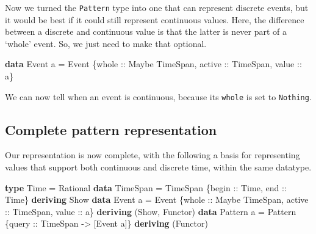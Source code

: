 \documentclass[
]{article}
\newenvironment{Shaded}{}{}
\newcommand{\DataTypeTok}[1]{\textcolor[rgb]{0.56,0.13,0.00}{#1}}
\newcommand{\KeywordTok}[1]{\textcolor[rgb]{0.00,0.44,0.13}{\textbf{#1}}}
\newcommand{\NormalTok}[1]{#1}
\newcommand{\OtherTok}[1]{\textcolor[rgb]{0.00,0.44,0.13}{#1}}
\begin{document}
Now we turned the \texttt{Pattern} type into one that can represent
discrete events, but it would be best if it could still represent
continuous values. Here, the difference between a discrete and
continuous value is that the latter is never part of a `whole' event.
So, we just need to make that optional.

\begin{Shaded}
\begin{Highlighting}[]
\KeywordTok{data} \DataTypeTok{Event}\NormalTok{ a }\OtherTok{=} \DataTypeTok{Event}\NormalTok{ \{}\OtherTok{whole ::} \DataTypeTok{Maybe} \DataTypeTok{TimeSpan}\NormalTok{,}\OtherTok{ active ::} \DataTypeTok{TimeSpan}\NormalTok{,}\OtherTok{ value ::}\NormalTok{ a\}}
\end{Highlighting}
\end{Shaded}

We can now tell when an event is continuous, because its \texttt{whole}
is set to \texttt{Nothing}.

\subsection{Complete pattern
representation}\label{complete-pattern-representation}

Our representation is now complete, with the following a basis for
representing values that support both continuous and discrete time,
within the same datatype.

\begin{Shaded}
\begin{Highlighting}[]
\KeywordTok{type} \DataTypeTok{Time} \OtherTok{=} \DataTypeTok{Rational}
\KeywordTok{data} \DataTypeTok{TimeSpan} \OtherTok{=} \DataTypeTok{TimeSpan}\NormalTok{ \{}\OtherTok{begin ::} \DataTypeTok{Time}\NormalTok{,}\OtherTok{ end ::} \DataTypeTok{Time}\NormalTok{\}}
    \KeywordTok{deriving} \DataTypeTok{Show}
\KeywordTok{data} \DataTypeTok{Event}\NormalTok{ a }\OtherTok{=} \DataTypeTok{Event}\NormalTok{ \{}\OtherTok{whole ::} \DataTypeTok{Maybe} \DataTypeTok{TimeSpan}\NormalTok{,}\OtherTok{ active ::} \DataTypeTok{TimeSpan}\NormalTok{,}\OtherTok{ value ::}\NormalTok{ a\}}
    \KeywordTok{deriving}\NormalTok{ (}\DataTypeTok{Show}\NormalTok{, }\DataTypeTok{Functor}\NormalTok{)}
\KeywordTok{data} \DataTypeTok{Pattern}\NormalTok{ a }\OtherTok{=} \DataTypeTok{Pattern}\NormalTok{ \{}\OtherTok{query ::} \DataTypeTok{TimeSpan} \OtherTok{{-}\textgreater{}}\NormalTok{ [}\DataTypeTok{Event}\NormalTok{ a]\}}
    \KeywordTok{deriving}\NormalTok{ (}\DataTypeTok{Functor}\NormalTok{)}
\end{Highlighting}
\end{Shaded}
\end{document}
